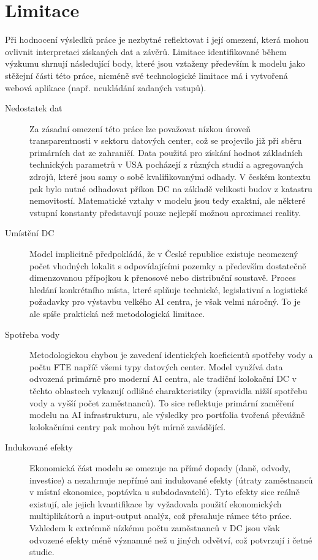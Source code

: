 \section{Limitace}
\label{subsec:limitace}

Při hodnocení výsledků práce je nezbytné reflektovat i její omezení, která mohou ovlivnit interpretaci získaných dat a závěrů. Limitace identifikované během výzkumu shrnují následující body, které jsou vztaženy především k modelu jako stěžejní části této práce, nicméně své technologické limitace má i vytvořená webová aplikace (např. neukládání zadaných vstupů).

\begin{description}
    
    \item[Nedostatek dat] Za zásadní omezení této práce lze považovat nízkou úroveň transparentnosti v sektoru datových center, což se projevilo již při sběru primárních dat ze zahraničí. Data použitá pro získání hodnot základních technických parametrů v USA pocházejí z různých studií a agregovaných zdrojů, které jsou samy o sobě kvalifikovanými odhady. V českém kontextu pak bylo nutné odhadovat příkon DC na základě velikosti budov z katastru nemovitostí. Matematické vztahy v modelu jsou tedy exaktní, ale některé vstupní konstanty představují pouze nejlepší možnou aproximaci reality.
    
    \item[Umístění DC] Model implicitně předpokládá, že v České republice existuje neomezený počet vhodných lokalit s odpovídajícími pozemky a především dostatečně dimenzovanou přípojkou k přenosové nebo distribuční soustavě. Proces hledání konkrétního místa, které splňuje technické, legislativní a logistické požadavky pro výstavbu velkého AI centra, je však velmi náročný. To je ale spíše praktická než metodologická limitace.
    
    \item[Spotřeba vody] Metodologickou chybou je zavedení identických koeficientů spotřeby vody a počtu FTE napříč všemi typy datových center. Model využívá data odvozená primárně pro moderní AI centra, ale tradiční kolokační DC v těchto oblastech vykazují odlišné charakteristiky (zpravidla nižší spotřebu vody a vyšší počet zaměstnanců). To sice reflektuje primární zaměření modelu na AI infrastrukturu, ale výsledky pro portfolia tvořená převážně kolokačními centry pak mohou být mírně zavádějící.
    
    \item[Indukované efekty] Ekonomická část modelu se omezuje na přímé dopady (daně, odvody, investice) a nezahrnuje nepřímé ani indukované efekty (útraty zaměstnanců v místní ekonomice, poptávka u subdodavatelů). Tyto efekty sice reálně existují, ale jejich kvantifikace by vyžadovala použití ekonomických multiplikátorů a input-output analýz, což přesahuje rámec této práce. Vzhledem k extrémně nízkému počtu zaměstnanců v DC jsou však odvozené efekty méně významné než u jiných odvětví, což potvrzují i četné studie.
    

\end{description}
